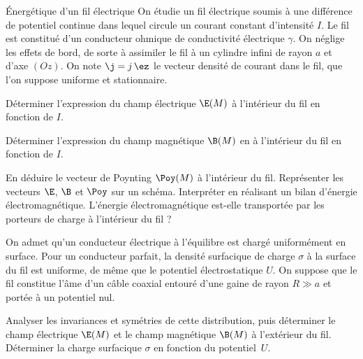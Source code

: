 \begin{exo}[PC][3][TD]{Énergétique d’un fil électrique}
  On étudie un fil électrique soumis à une différence de potentiel continue dans lequel circule un courant constant d’intensité $I$. Le fil est constitué d’un conducteur ohmique de conductivité électrique $\gamma$. On néglige les effets de bord, de sorte à assimiler le fil à un cylindre infini de rayon $a$ et d’axe $(Oz)$. On note $\j = j\,\ez$ le vecteur densité de courant dans le fil, que l’on suppose uniforme et stationnaire.

\begin{quest}
\item  Déterminer l'expression du champ électrique $\E(M)$ à l’intérieur du fil en fonction de $I$.
\item Déterminer l’expression du champ magnétique $\B(M)$ en à l'intérieur du fil en fonction de $I$.
\item En déduire le vecteur de  Poynting $\Poy(M)$ à l’intérieur du fil.  Représenter les vecteurs $\E$, $\B$ et $\Poy$ sur un schéma.  Interpréter en réalisant un bilan d’énergie électromagnétique. L'énergie électromagnétique est-elle transportée par les porteurs de charge à l'intérieur du fil ?
\end{quest}
 On admet qu'un conducteur électrique à l’équilibre est chargé uniformément en surface. Pour un conducteur parfait, la densité surfacique de charge  $\sigma$ à la surface du fil est uniforme, de même que le potentiel électrostatique $U$. On suppose que le fil constitue l'âme d'un câble coaxial entouré d'une gaine de rayon $R \gg a$ et portée à un potentiel nul.
\begin{quest}
\item Analyser les invariances et symétries de cette distribution, puis déterminer le champ électrique $\E(M)$ et le champ magnétique $\B(M)$ à l’extérieur du fil. Déterminer la charge surfacique $\sigma$ en fonction du potentiel~$U$.

\end{quest}
\end{exo}
